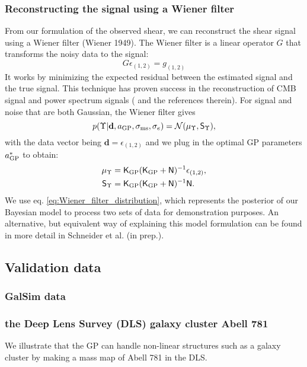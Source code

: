 \subsubsection{Reconstructing the signal using a Wiener filter}
From our formulation of the observed shear, 
we can reconstruct the shear signal using a Wiener filter (Wiener 1949). 
The Wiener filter is a linear operator $G$ that transforms the noisy
data to the signal:
\begin{equation}
	G\epsilon_{(1, 2)} = g_{(1, 2)}
\end{equation}
It works by minimizing the expected residual between the estimated signal and the true
signal. This technique has proven success in the reconstruction of CMB signal
and power spectrum signals (\citealt{Elsner2013} and the references therein).
For signal and noise that are both Gaussian, the Wiener filter gives 
\begin{equation}
	p(\Upsilon| \mathbf{d}, a_{\rm GP}, \sigma_{\rm ms}, \sigma_e) = \mathcal{N}(\mu_\Upsilon,
	\mathsf{S}_\Upsilon),
	\label{eq:Wiener_filter_distribution}
\end{equation}
with the data vector being $\mathbf{d} = \epsilon_{(1, 2)}$ and we plug in the
optimal GP parameters $a_{\rm GP}^*$ to obtain:
\begin{align}
\mu_\Upsilon & = \mathsf{K}_{\rm GP}(\mathsf{K}_{\rm GP} + \mathsf{N})^{-1}
\epsilon_{(1, 2)}, \\
\mathsf{S}_\Upsilon & = \mathsf{K}_{\rm GP}(\mathsf{K}_{\rm GP} +
\mathsf{N})^{-1}\mathsf{N}.
\end{align}
We use eq. \ref{eq:Wiener_filter_distribution}, which represents the posterior
of our Bayesian model to process two sets of
data for demonstration purposes. An alternative, but equivalent way of explaining this
model formulation can be found in more detail in Schneider et al. (in prep.).

\subsection{Validation data}
\subsubsection{{\sc GalSim} data}

\subsubsection{the Deep Lens Survey (DLS) galaxy cluster Abell 781}
We illustrate that the GP can handle non-linear structures such as a galaxy cluster 
by making a mass map of Abell 781 in the DLS. 

